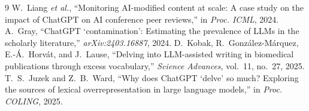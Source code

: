 \documentclass[a4paper,10pt,twocolumn]{article}
\begin{document}
\begin{thebibliography}{9}\small
{} W.~Liang \emph{et al.}, ``Monitoring AI-modified content at scale: A case study on the impact of ChatGPT on AI conference peer reviews,'' in \emph{Proc. ICML}, 2024.
 A.~Gray, ``ChatGPT `contamination': Estimating the prevalence of LLMs in the scholarly literature,'' \emph{arXiv:2403.16887}, 2024.
 D.~Kobak, R.~Gonz\'alez-M\'arquez, E.-\'A.~Horv\'at, and J.~Lause, ``Delving into LLM-assisted writing in biomedical publications through excess vocabulary,'' \emph{Science Advances}, vol.~11, no.~27, 2025.
 T.~S.~Juzek and Z.~B.~Ward, ``Why does ChatGPT `delve' so much? Exploring the sources of lexical overrepresentation in large language models,'' in \emph{Proc. COLING}, 2025.
\end{thebibliography}
\end{document}
